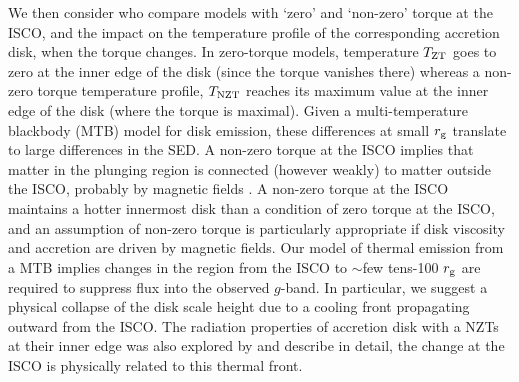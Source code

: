 \documentclass[a4paper,fleqn,usenatbib]{mnras}
\begin{document}
We then consider \citet{Zimmerman2005} who compare models with `zero'
and `non-zero' torque at the ISCO, and the impact on the temperature
profile of the corresponding accretion disk, when the torque changes.
In zero-torque models, temperature $T_{\rm ZT}$ goes to zero at the
inner edge of the disk (since the torque vanishes there) whereas a
non-zero torque temperature profile, $T_{\rm NZT}$ reaches its maximum
value at the inner edge of the disk (where the torque is maximal).
Given a multi-temperature blackbody (MTB) model for disk emission,
these differences at small $r_{\rm g}$ translate to large differences
in the SED.  A non-zero torque at the ISCO implies that matter in the
plunging region is connected (however weakly) to matter outside the
ISCO, probably by magnetic fields \citet[e.g., ][]{Gammie1999,
Agol_Krolik2000}. A non-zero torque at the ISCO maintains a hotter
innermost disk than a condition of zero torque at the ISCO, and an
assumption of non-zero torque is particularly appropriate if disk
viscosity and accretion are driven by magnetic fields. Our model of
thermal emission from a MTB implies changes in the region from the
ISCO to $\sim$few tens-100 $r_{\rm g}$ are required to suppress flux
into the observed $g$-band. In particular, we suggest a physical
collapse of the disk scale height due to a cooling front propagating
outward from the ISCO. The radiation properties of accretion disk with
a NZTs at their inner edge was also explored by \citet{Cao2003} and
\citet{Cannizzo1998b} describe in detail, the change at the ISCO is
physically related to this thermal front.
\end{document}
